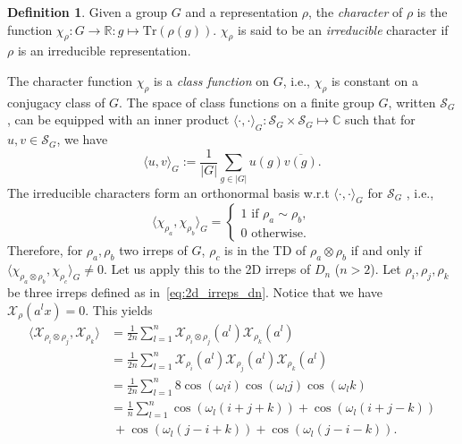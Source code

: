 \documentclass{article}
\theoremstyle{plain}
\theoremstyle{definition}
\newtheorem{definition}[theorem]{Definition}
\theoremstyle{remark}
\begin{document}
\begin{definition}{\citep{steinberg2011representation}}
    Given a group $G$ and a representation $\rho$, the \emph{character} of $\rho$ is the function $\chi_\rho:G\rightarrow\mathbb{R}:g\mapsto\mathrm{Tr}(\rho(g))$. $\chi_\rho$ is said to be an \emph{irreducible} character if $\rho$ is an irreducible representation.
\end{definition}
The character function $\chi_\rho$ is a \emph{class function} on $G$, i.e., $\chi_\rho$ is constant on a conjugacy class of $G$. The space of class functions on a finite group $G$, written $\mathcal{S}_G$, can be equipped with an inner product $\langle\cdot,\cdot\rangle_G:\mathcal{S}_G\times \mathcal{S}_G\mapsto \mathbb{C}$ such that for $u,v\in \mathcal{S}_G$, we have
\begin{equation}
    \langle u, v\rangle_G:=\frac{1}{|G|}\sum_{g\in|G|}u(g)\overline{v(g)}.
\end{equation}
The irreducible characters form an orthonormal basis w.r.t  $\langle\cdot,\cdot\rangle_G$ for $\mathcal{S}_G$ \citep{steinberg2011representation}, i.e.,
\begin{equation}
    \langle \chi_{\rho_a},\chi_{\rho_b}\rangle_G=\begin{cases}
        1\text{ if } \rho_a\sim \rho_b,\\
        0 \text{ otherwise.}
    \end{cases}
\end{equation}
Therefore, for $\rho_a, \rho_b$ two irreps of $G$, $\rho_c$ is in the TD of $\rho_a\otimes\rho_b$ if and only if $ \langle \chi_{\rho_a\otimes \rho_b},\chi_{\rho_c}\rangle_G\neq 0$. Let us apply this to the 2D irreps of $D_n$ ($n>2$). Let $\rho_i,\rho_j,\rho_k$ be three irreps defined as in~\eqref{eq:2d_irreps_dn}.
Notice that we have $\mathcal{X}_{\rho}(a^lx)=0$. This yields
\begin{align*}
    \langle \mathcal{X}_{\rho_i\otimes\rho_j},\mathcal{X}_{\rho_k}\rangle &=\frac{1}{2n}\sum_{l=1}^n \mathcal{X}_{\rho_i\otimes\rho_j}(a^l)\mathcal{X}_{\rho_k}(a^l)\\
    &=\frac{1}{2n}\sum_{l=1}^n \mathcal{X}_{\rho_i}(a^l)\mathcal{X}_{\rho_j}(a^l)\mathcal{X}_{\rho_k}(a^l)\\
    &=\frac{1}{2n}\sum_{l=1}^n 8\cos(\omega_l i)\cos(\omega_l j)\cos(\omega_l k)\\
    &=\frac{1}{n}\sum_{l=1}^n \cos(\omega_l (i+j+k))+\cos(\omega_l (i+j-k))\\ &\ +\cos(\omega_l (j-i+k))+\cos(\omega_l (j-i-k)).
\end{align*}
\end{document}
